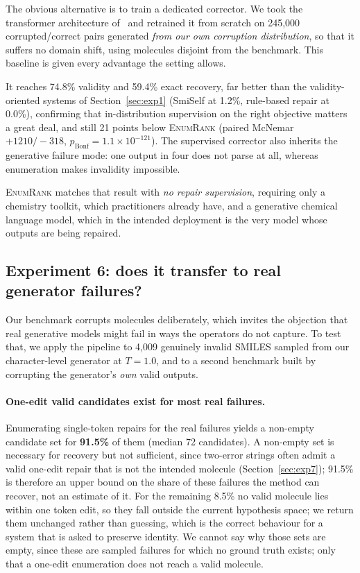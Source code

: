 \documentclass[11pt]{article}
\newcommand{\ours}{\textsc{EnumRank}}
\begin{document}
The obvious alternative is to train a dedicated corrector. We took the
transformer architecture of~\citet{schoenmaker2023uncorrupt} and retrained it from
scratch on 245{,}000 corrupted/correct pairs generated \emph{from our own
corruption distribution}, so that it suffers no domain shift, using molecules
disjoint from the benchmark. This baseline is given every advantage the setting
allows.

It reaches 74.8\% validity and 59.4\% exact recovery, far better than the
validity-oriented systems of Section~\ref{sec:exp1} (SmiSelf at 1.2\%,
rule-based repair at 0.0\%), confirming that in-distribution supervision on the
right objective matters a great deal, and still 21 points below \ours{} (paired
McNemar $+1210/{-}318$, $p_{\text{Bonf}} = 1.1\times10^{-121}$). The supervised
corrector also inherits the generative failure mode: one output in four does not
parse at all, whereas enumeration makes invalidity impossible.

\ours{} matches that result with \emph{no repair supervision}, requiring only a
chemistry toolkit, which practitioners already have, and a generative chemical
language model, which in the intended deployment is the very model whose outputs
are being repaired.

\subsection{Experiment 6: does it transfer to real generator failures?}\label{sec:exp6}

Our benchmark corrupts molecules deliberately, which invites the objection that
real generative models might fail in ways the operators do not capture. To test
that, we apply the pipeline to 4{,}009 genuinely invalid SMILES sampled from our
character-level generator at $T=1.0$, and to a second benchmark built by
corrupting the generator's \emph{own} valid outputs.

\paragraph{One-edit valid candidates exist for most real failures.}
Enumerating single-token repairs for the real failures yields a non-empty
candidate set for \textbf{91.5\%} of them (median 72 candidates). A non-empty
set is necessary for recovery but not sufficient, since two-error strings often
admit a valid one-edit repair that is not the intended molecule
(Section~\ref{sec:exp7}); 91.5\% is therefore an upper bound on the share of these
failures the method can recover, not an estimate of it. For the remaining 8.5\% no valid molecule lies within one
token edit, so they fall outside the current hypothesis space; we return them
unchanged rather than guessing, which is the correct behaviour for a system that
is asked to preserve identity. We cannot say why those sets are empty, since
these are sampled failures for which no ground truth exists; only that a one-edit
enumeration does not reach a valid molecule.
\end{document}
